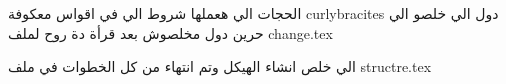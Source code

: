 الحجات الي هعملها 
شروط الي في اقواس معكوفة curlybracites
دول الي خلصو 
الي حرين دول مخلصوش
 بعد قرأة دة روح لملف   change.tex

 الي خلص 
 {
    انشاء الهيكل  وتم انتهاء من كل الخطوات في ملف
    structre.tex
 }